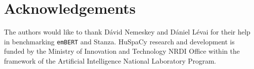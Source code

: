 \documentclass{llncs}
\newcommand{\embert}{\texttt{emBERT}}
\newcommand{\stanza}{Stanza}
\begin{document}

\section*{Acknowledgements}
The authors would like to thank Dávid Nemeskey and Dániel Lévai for their help in benchmarking \embert{} and \stanza{}.
HuSpaCy research and development is funded by the Ministry of Innovation and Technology NRDI Office within the framework of the Artificial Intelligence National Laboratory Program. 

%
\renewcommand\bibname{\refname}
\renewcommand\bibname{References}


\end{document}
